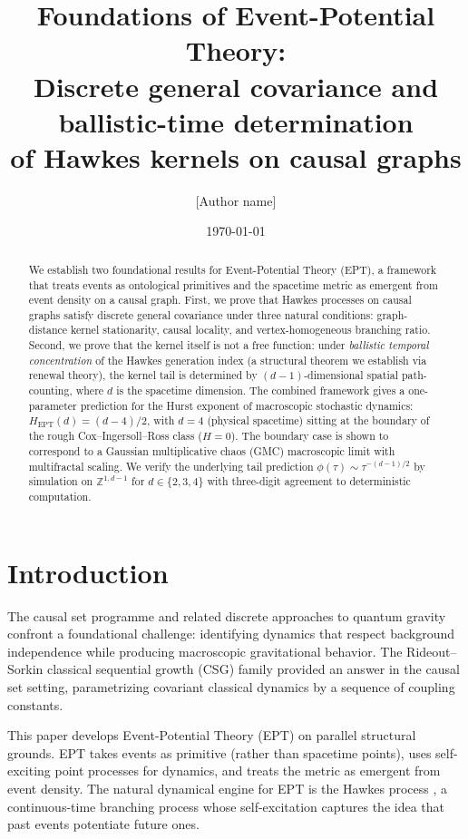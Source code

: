 \documentclass[11pt,a4paper]{article}
\title{Foundations of Event-Potential Theory:\\
Discrete general covariance and ballistic-time determination\\
of Hawkes kernels on causal graphs}
\author{[Author name]\\ [Affiliation]}
\date{\today}
\begin{document}
\maketitle

\begin{abstract}
We establish two foundational results for Event-Potential Theory (EPT), a framework that treats events as ontological primitives and the spacetime metric as emergent from event density on a causal graph. First, we prove that Hawkes processes on causal graphs satisfy discrete general covariance under three natural conditions: graph-distance kernel stationarity, causal locality, and vertex-homogeneous branching ratio. Second, we prove that the kernel itself is not a free function: under \emph{ballistic temporal concentration} of the Hawkes generation index (a structural theorem we establish via renewal theory), the kernel tail is determined by $(d-1)$-dimensional spatial path-counting, where $d$ is the spacetime dimension. The combined framework gives a one-parameter prediction for the Hurst exponent of macroscopic stochastic dynamics: $H_{\mathrm{EPT}}(d) = (d-4)/2$, with $d = 4$ (physical spacetime) sitting at the boundary of the rough Cox--Ingersoll--Ross class ($H = 0$). The boundary case is shown to correspond to a Gaussian multiplicative chaos (GMC) macroscopic limit with multifractal scaling. We verify the underlying tail prediction $\phi(\tau) \sim \tau^{-(d-1)/2}$ by simulation on $\mathbb{Z}^{1,d-1}$ for $d \in \{2,3,4\}$ with three-digit agreement to deterministic computation.
\end{abstract}

\section{Introduction}

The causal set programme \cite{BLMS1987} and related discrete approaches to quantum gravity confront a foundational challenge: identifying dynamics that respect background independence while producing macroscopic gravitational behavior. The Rideout--Sorkin classical sequential growth (CSG) family \cite{RS1999} provided an answer in the causal set setting, parametrizing covariant classical dynamics by a sequence of coupling constants.

This paper develops Event-Potential Theory (EPT) on parallel structural grounds. EPT takes events as primitive (rather than spacetime points), uses self-exciting point processes for dynamics, and treats the metric as emergent from event density. The natural dynamical engine for EPT is the Hawkes process \cite{Hawkes1971}, a continuous-time branching process whose self-excitation captures the idea that past events potentiate future ones.
\end{document}
